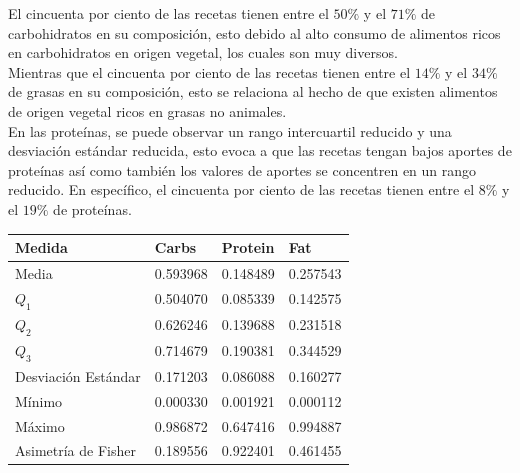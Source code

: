 \documentclass[12pt,a4paper]{article}
\begin{document}
            El cincuenta por ciento de las recetas tienen entre el $50\%$ y el $71\%$ 
            de carbohidratos en su composición, esto debido al alto consumo de 
            alimentos ricos en carbohidratos en origen vegetal, los cuales son 
            muy diversos.\\

            Mientras que el cincuenta por ciento de las recetas tienen entre el $14\%$ y 
            el $34\%$ de grasas en su composición, esto se relaciona al hecho de que 
            existen alimentos de origen vegetal ricos en grasas no animales.\\
            
            En las proteínas, se puede observar un rango intercuartil reducido y una 
            desviación estándar reducida, esto evoca a que las recetas tengan bajos 
            aportes de proteínas así como también los valores de aportes se concentren 
            en un rango reducido. En específico, el cincuenta por ciento de las recetas 
            tienen entre el $8\%$ y el $19\%$ de proteínas.

            \begin{center}
                \begin{tabular}{l|lll}
                    \hline
                        Medida & Carbs & Protein & Fat \\
                    \hline
                        Media               & 0.593968 & 0.148489 & 0.257543  \\
                        $Q_1$               & 0.504070 & 0.085339 & 0.142575  \\
                        $Q_2$               & 0.626246 & 0.139688 & 0.231518  \\
                        $Q_3$               & 0.714679 & 0.190381 & 0.344529  \\
                        Desviación Estándar & 0.171203 & 0.086088 & 0.160277  \\
                        Mínimo              & 0.000330 & 0.001921 & 0.000112  \\
                        Máximo              & 0.986872 & 0.647416 & 0.994887  \\
                        Asimetría de Fisher & 0.189556 & 0.922401 & 0.461455  \\
                    \hline
                \end{tabular}
            \end{center}
\end{document}
